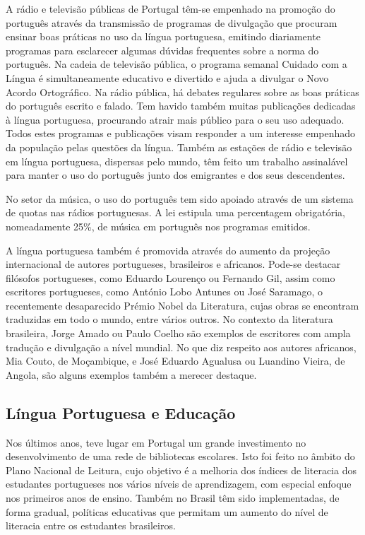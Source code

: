 \begin{multicols}{2}
A rádio e televisão públicas de Portugal têm-se empenhado na promoção do português através da transmissão de programas de divulgação
que procuram ensinar boas práticas no uso da língua portuguesa, emitindo diariamente programas para esclarecer algumas dúvidas frequentes sobre a norma do português. 
Na cadeia de televisão pública, o programa semanal Cuidado com a Língua é simultaneamente educativo e divertido e ajuda a divulgar o Novo Acordo Ortográfico. 
Na rádio pública, há debates regulares sobre as boas práticas do português escrito e falado.
Tem havido também muitas pu\-bli\-ca\-ções dedicadas à língua portuguesa, procurando atrair mais público para o seu uso adequado. 
Todos estes programas e publicações visam responder a um interesse empenhado da população pelas questões da língua. 
Também as estações de rádio e televisão em língua portuguesa, dispersas pelo mundo, têm feito um trabalho assinalável 
para manter o uso do português junto dos emigrantes e dos seus descendentes.


No setor da música, o uso do português tem sido apoiado através de um sistema de quotas nas rádios portuguesas. 
A lei estipula uma per\-cen\-ta\-gem obrigatória, nomeadamente 25\%, de música em português nos programas emitidos. 

A língua portuguesa também é promovida através do aumento da projeção internacional de autores portugueses, brasileiros e africanos. 
Pode-se destacar filósofos portugueses, como Eduardo Lourenço ou Fernando Gil, 
assim como escritores portugueses, como António Lobo Antunes ou José Saramago, o recentemente desaparecido Prémio Nobel
da Literatura, cujas obras se encontram traduzidas em todo o mundo, entre vários outros. 
No contexto da literatura brasileira, Jorge Amado ou Paulo Coelho são exemplos de escritores com ampla tradução e divulgação a nível mundial. 
No que diz respeito aos autores africanos, Mia Couto, de Moçambique, e José Eduardo Agualusa ou Luandino Vieira, de Angola, são alguns exemplos também a 
merecer destaque.



\subsection{Língua Portuguesa e Educação}

Nos últimos anos, teve lugar em Portugal um grande investimento no desenvolvimento de uma rede de bibliotecas escolares. 
Isto foi feito no âmbito do Plano Nacional de Leitura, cujo objetivo é a melhoria dos índices de literacia dos estudantes portugueses 
nos vários níveis de aprendizagem, com especial enfoque nos primeiros anos de ensino. 
Também no Brasil têm sido implementadas, de forma gradual, políticas educativas que permitam um aumento 
do nível de literacia entre os estudantes brasileiros.


\end{multicols}
